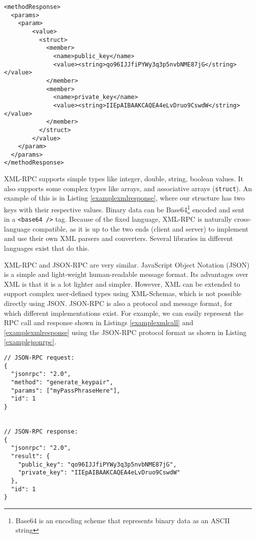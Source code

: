 \begin{lstlisting}
<methodResponse>
  <params>
    <param>
        <value>
          <struct>
            <member>
              <name>public_key</name>
              <value><string>qo96IJJfiPYWy3q3p5nvbNME87jG</string></value>
            </member>
            <member>
              <name>private_key</name>
              <value><string>IIEpAIBAAKCAQEA4eLvDruo9CswdW</string></value>
            </member>
          </struct>
        </value>
    </param>
  </params>
</methodResponse>
\end{lstlisting}

XML-RPC supports simple types like integer, double, string, boolean values. It also supports some complex types like arrays, and associative arrays (\lstinline{struct}). An example of this is in Listing \ref{examplexmlresponse}, where our structure has two keys with their respective values. Binary data can be Base64\footnote{Base64 is an encoding scheme that represents binary data as an ASCII string} encoded and sent in a \lstinline{<base64 />} tag. Because of the fixed language, XML-RPC is naturally cross-language compatible, as it is up to the two ends (client and server) to implement and use their own XML parsers and converters. Several libraries in different languages exist that do this.

XML-RPC and JSON-RPC are very similar. JavaScript Object Notation (JSON) is a simple and light-weight human-readable message format. Its advantages over XML is that it is a lot lighter and simpler. However, XML can be extended to support complex user-defined types using XML-Schemas, which is not possible directly using JSON. JSON-RPC is also a protocol and message format, for which different implementations exist. For example, we can easily represent the RPC call and response shown in Listings \ref{examplexmlcall} and \ref{examplexmlresponse} using the JSON-RPC protocol format as shown in Listing \ref{examplejsonrpc}.
\\

\begin{lstlisting}
// JSON-RPC request:
{ 
  "jsonrpc": "2.0", 
  "method": "generate_keypair", 
  "params": ["myPassPhraseHere"], 
  "id": 1
}


// JSON-RPC response:
{
  "jsonrpc": "2.0", 
  "result": {
    "public_key": "qo96IJJfiPYWy3q3p5nvbNME87jG",
    "private_key": "IIEpAIBAAKCAQEA4eLvDruo9CswdW"
  }, 
  "id": 1
}

\end{lstlisting}

